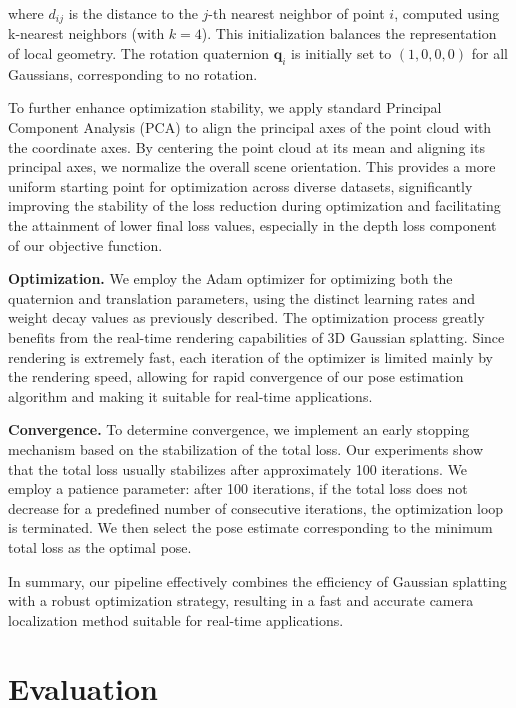 \documentclass[twocolumn]{article} %
\begin{document}
where \(d_{ij}\) is the distance to the \(j\)-th nearest neighbor of
point \(i\), computed using k-nearest neighbors (with \(k=4\)). This
initialization balances the representation of local geometry. The
rotation quaternion \(\mathbf{q}_i\) is initially set to
\((1, 0, 0, 0)\) for all Gaussians, corresponding to no rotation.

To further enhance optimization stability, we apply standard Principal
Component Analysis (PCA) to align the principal axes of the point cloud
with the coordinate axes. By centering the point cloud at its mean and
aligning its principal axes, we normalize the overall scene orientation.
This provides a more uniform starting point for optimization across
diverse datasets, significantly improving the stability of the loss
reduction during optimization and facilitating the attainment of lower
final loss values, especially in the depth loss component of our
objective function.

\textbf{Optimization.} We employ the Adam optimizer for optimizing both
the quaternion and translation parameters, using the distinct learning
rates and weight decay values as previously described. The optimization
process greatly benefits from the real-time rendering capabilities of 3D
Gaussian splatting. Since rendering is extremely fast, each iteration of
the optimizer is limited mainly by the rendering speed, allowing for
rapid convergence of our pose estimation algorithm and making it
suitable for real-time applications.

\textbf{Convergence.} To determine convergence, we implement an early
stopping mechanism based on the stabilization of the total loss. Our
experiments show that the total loss usually stabilizes after
approximately 100 iterations. We employ a patience parameter: after 100
iterations, if the total loss does not decrease for a predefined number
of consecutive iterations, the optimization loop is terminated. We then
select the pose estimate corresponding to the minimum total loss as the
optimal pose.

In summary, our pipeline effectively combines the efficiency of Gaussian
splatting with a robust optimization strategy, resulting in a fast and
accurate camera localization method suitable for real-time applications.

\section{Evaluation}\label{evaluation}
\end{document}
